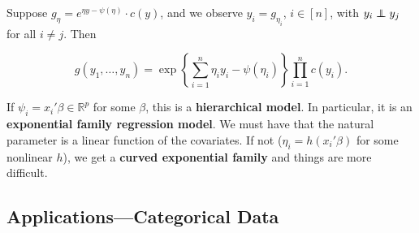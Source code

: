 Suppose \(g_\eta = e^{\eta y - \psi(\eta)} \cdot c(y)\), and we observe \(y_i = g_{\eta_i}\), \(i \in [n]\), with \(y_i \indep y_j\) for all \(i \neq j\). Then

\[
g(y_1, \ldots, y_n) = \exp \left\{  \sum_{i=1}^n \eta_i y_i - \psi(\eta_i) \right\} \prod_{i=1}^n c(y_i).
\]

If \(\psi_i  = x_i' \beta \in \mathbb{R}^p\) for some \(\beta\), this is a \textbf{hierarchical model}. In particular, it is an \textbf{exponential family regression model}. We must have that the natural parameter is a linear function of the covariates. If not (\(\eta_i= h(x_i' \beta)\) for some nonlinear \(h\)), we get a \textbf{curved exponential family} and things are more difficult.

\subsection{Applications---Categorical Data}

